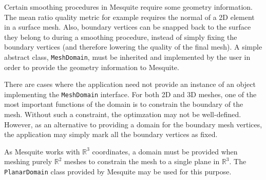 Certain smoothing procedures in Mesquite require some geometry information. The mean ratio quality
metric for example requires the normal of a 2D element in a surface mesh. Also, boundary
vertices can be snapped back to the surface they belong to during a smoothing procedure, instead of
simply fixing the boundary vertices (and therefore lowering the quality of the final mesh). A simple abstract
class, \texttt{MeshDomain}, must be inherited and implemented by the user in order to provide the
geometry information to Mesquite.  

There are cases where the application need not provide an instance of an
object implementing the {\tt MeshDomain} interface.  For both 2D and 3D meshes,
one of the most important functions of the domain is to constrain the boundary
of the mesh.  Without such a constraint, the optimzation may not be well-defined.  However, as an alternative to providing a domain for the boundary
mesh vertices, the application may simply mark all the boundary vertices as 
fixed.  

As Mesquite works with $\mathbb{R}^{3}$ coordinates, a domain must be provided
when meshing purely $\mathbb{R}^{2}$ meshes to constrain the mesh to a single plane in $\mathbb{R}^{3}$.  The {\tt PlanarDomain} class provided by Mesquite may be 
used for this purpose.
